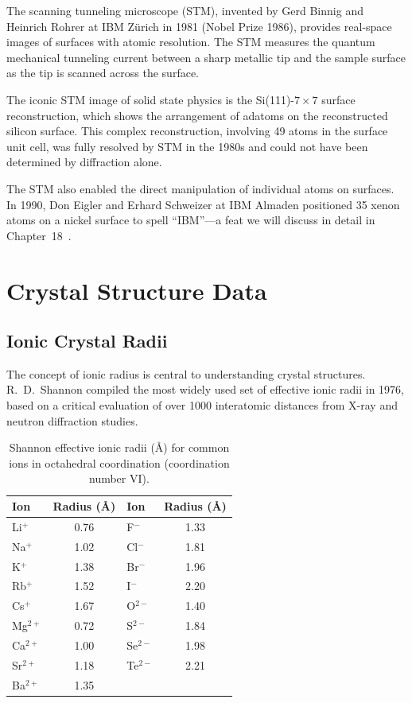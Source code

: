 The scanning tunneling microscope (STM), invented by Gerd Binnig and Heinrich Rohrer at IBM Z\"urich in 1981 (Nobel Prize 1986), provides real-space images of surfaces with atomic resolution. The STM measures the quantum mechanical tunneling current between a sharp metallic tip and the sample surface as the tip is scanned across the surface.

The iconic STM image of solid state physics is the Si(111)-$7 \times 7$ surface reconstruction, which shows the arrangement of adatoms on the reconstructed silicon surface. This complex reconstruction, involving 49 atoms in the surface unit cell, was fully resolved by STM in the 1980s and could not have been determined by diffraction alone.

The STM also enabled the direct manipulation of individual atoms on surfaces. In 1990, Don Eigler and Erhard Schweizer at IBM Almaden positioned 35 xenon atoms on a nickel surface to spell ``IBM''---a feat we will discuss in detail in Chapter~18~\cite{eigler1991switch}.


\section{Crystal Structure Data}

\subsection{Ionic Crystal Radii}

The concept of ionic radius is central to understanding crystal structures. R.~D.~Shannon compiled the most widely used set of effective ionic radii in 1976, based on a critical evaluation of over 1000 interatomic distances from X-ray and neutron diffraction studies.

\begin{table}[H]
\centering
\caption{Shannon effective ionic radii (\AA{}) for common ions in octahedral coordination (coordination number VI).}
\label{tab:shannon}
\begin{tabular}{@{}lSlS@{}}
\toprule
Ion & {Radius (\AA{})} & Ion & {Radius (\AA{})} \\
\midrule
Li$^+$  & 0.76 & F$^-$   & 1.33 \\
Na$^+$  & 1.02 & Cl$^-$  & 1.81 \\
K$^+$   & 1.38 & Br$^-$  & 1.96 \\
Rb$^+$  & 1.52 & I$^-$   & 2.20 \\
Cs$^+$  & 1.67 & O$^{2-}$  & 1.40 \\
Mg$^{2+}$ & 0.72 & S$^{2-}$  & 1.84 \\
Ca$^{2+}$ & 1.00 & Se$^{2-}$ & 1.98 \\
Sr$^{2+}$ & 1.18 & Te$^{2-}$ & 2.21 \\
Ba$^{2+}$ & 1.35 & & \\
\bottomrule
\end{tabular}
\end{table}

